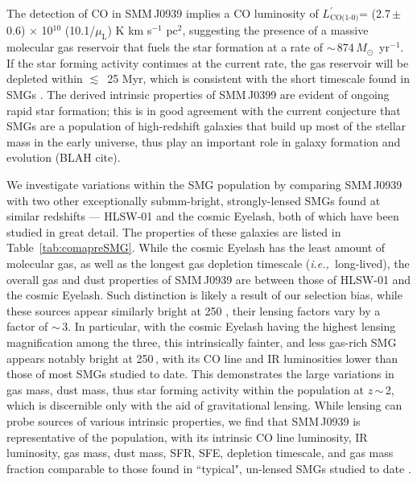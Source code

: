 \documentclass[twocolumn,apj,numberedappendix]{emulateapj}
\newcommand{\Msun}{\mbox{$M_{\odot}$}}
\newcommand{\Lp}{\mbox{$L^{\prime}_\textrm{CO(1-0)}$}}
\newcommand{\LpU}{\mbox{K\,\,km\,\,s$^{-1}$\,\,pc$^2$}}
\newcommand{\eg}{{\sl e.g.,~}}
\newcommand{\ie}{{\sl i.e.,~}}
\newcommand{\pmOne}{\mbox{$^{-1}$}}
\begin{document}
The detection of CO in SMM\,J0939 
implies a CO luminosity of \Lp = (2.7\,$\pm$\,0.6) $\times$ 10$^{10}$ (10.1/$\mu_\textrm{L}$) \LpU, suggesting the presence of a massive 
molecular gas reservoir that fuels the star formation at a rate of $\sim$\,874\,\Msun~yr\pmOne. If the star forming activity continues at the current rate, the gas reservoir will be depleted within $\lesssim$~25 Myr, 
which is consistent with the short timescale found in SMGs \citep{Greve05a}. The derived intrinsic properties of SMM\,J0399 are evident of ongoing rapid star formation; this is in good agreement with the current conjecture that SMGs are a 
population of high-redshift galaxies that build up most of the stellar mass in the early universe, thus play an important role 
in galaxy formation and evolution (BLAH cite). 

We investigate variations within the SMG population by comparing SMM\,J0939 with two other exceptionally submm-bright, 
strongly-lensed SMGs
found at similar redshifts --- HLSW-01 and the cosmic Eyelash, both of which have been studied in great detail. The properties 
of these galaxies are listed in Table~\ref{tab:comapreSMG}. While the cosmic Eyelash has the least amount of molecular gas, as well as 
the 
longest gas depletion timescale (\ie long-lived), the overall gas and dust properties of SMM\,J0939 are between those of HLSW-01 and the 
cosmic
Eyelash. Such distinction is likely a result of our selection bias, while these sources appear similarly bright at 250 \micron, their lensing factors 
vary by a factor of $\sim$\,3. In particular, with the cosmic Eyelash having the highest lensing magnification among the 
three, this
intrinsically fainter, and less gas-rich SMG appears notably bright 
at 250\,\micron, with its CO line and IR luminosities lower than those of most SMGs studied to date. 
This demonstrates 
the large variations in gas mass, dust mass, thus star forming activity within the population at $z$\,$\sim$\,2, which is discernible only
 with the aid of gravitational lensing. 
While lensing can probe sources 
of various intrinsic properties, we find that SMM\,J0939 is representative of the population, with its intrinsic CO line luminosity, IR luminosity, gas mass, 
dust mass, SFR, SFE, depletion timescale, and gas mass fraction comparable to those found in ``typical", un-lensed SMGs studied to date 
\citep[\eg ][]{Greve05a,Tacconi10a}.
\end{document}
